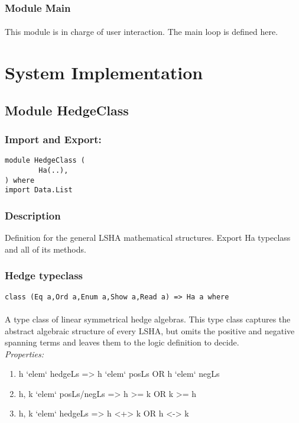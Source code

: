\documentclass[../gr-final.tex]{subfiles}
\begin{document}
\subsubsection{Module Main}

\paragraph{}This module is in charge of user interaction. The main
loop is defined here.
\section{System Implementation}

\subsection{Module HedgeClass}

\subsubsection{Import and Export:}

\begin{lstlisting}
module HedgeClass (
        Ha(..),
) where
import Data.List
\end{lstlisting}

\subsubsection{Description} Definition for the general LSHA mathematical
structures. Export Ha typeclass and all of its methods.
\subsubsection{Hedge typeclass}
\begin{lstlisting}
class (Eq a,Ord a,Enum a,Show a,Read a) => Ha a where
\end{lstlisting}

\paragraph{} A type class of linear symmetrical hedge algebras. This type
class captures the abstract algebraic structure of every LSHA,
but omits the positive and negative spanning terms and leaves
them to the logic definition to decide.\\

\emph{Properties:}
\begin{enumerate}
        \item h `elem` hedgeLs => h `elem` posLs OR h `elem` negLs
        \item h, k `elem` posLs/negLs => h >= k OR k >= h
        \item h, k `elem` hedgeLs => h <+> k OR h <-> k
\end{enumerate}
\end{document}
